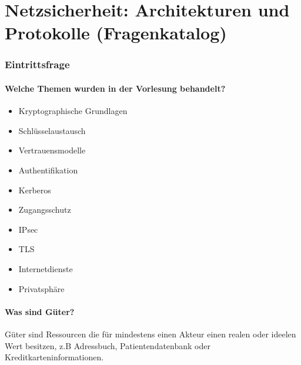 \chapter{Netzsicherheit: Architekturen und Protokolle (Fragenkatalog)}

\subsection{Eintrittsfrage}
	\subsubsection{Welche Themen wurden in der Vorlesung behandelt?}
		\begin{itemize}
			\item{Kryptographische Grundlagen}
			\item{Schlüsselaustausch}
			\item{Vertrauensmodelle}
			\item{Authentifikation}
			\item{Kerberos}
			\item{Zugangsschutz}
			\item{IPsec}
			\item{TLS}
			\item{Internetdienste}
			\item{Privatsphäre}
		\end{itemize}
		
	\subsubsection{Was sind Güter?}
	Güter sind Ressourcen die für mindestens einen Akteur einen realen oder ideelen Wert besitzen, z.B Adressbuch, Patientendatenbank oder Kreditkarteninformationen.
	
